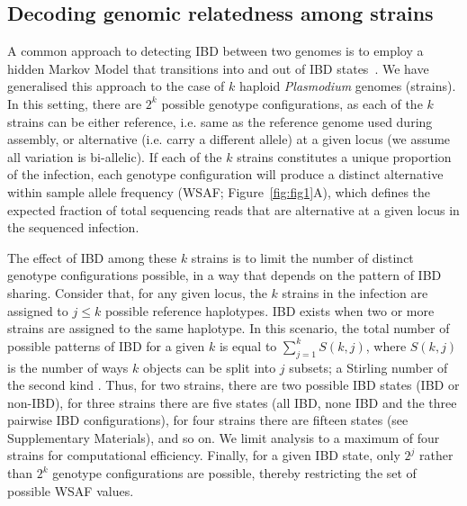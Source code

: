 \documentclass[9pt,lineno]{elife}
\begin{document}
\subsection{Decoding genomic relatedness among strains}

A common approach to detecting IBD between two genomes is to employ a hidden Markov Model that transitions into and out of IBD states~\citep{Chang2015, Gusev2009, Gusev2011}.  We have generalised this approach to the case of $k$ haploid {\it Plasmodium} genomes (strains). In this setting, there are $2^k$ possible genotype configurations, as each of the $k$ strains can be either reference, i.e. same as the reference genome used during assembly, or alternative (i.e. carry a different allele) at a given locus (we assume all variation is bi-allelic). If each of the $k$ strains constitutes a unique proportion of the infection, each genotype configuration will produce a distinct alternative within sample allele frequency (WSAF; Figure~\ref{fig:fig1}A), which defines the expected fraction of total sequencing reads that are alternative at a given locus in the sequenced infection.

The effect of IBD among these $k$ strains is to limit the number of distinct genotype configurations possible, in a way that depends on the pattern of IBD sharing. Consider that, for any given locus, the $k$ strains in the infection are assigned to $j \leq k$ possible reference haplotypes. IBD exists when two or more strains are assigned to the same haplotype. In this scenario, the total number of possible patterns of IBD for a given $k$ is equal to $\sum_{j=1}^{k} S(k,j)$, where $S(k,j)$ is the number of ways $k$ objects can be split into $j$ subsets; a Stirling number of the second kind \citep{Ronald1988}. Thus, for two strains, there are two possible IBD states (IBD or non-IBD), for three strains there are five states (all IBD, none IBD and the three pairwise IBD configurations), for four strains there are fifteen states (see Supplementary Materials), and so on. We limit analysis to a maximum of four strains for computational efficiency. Finally, for a given IBD state, only $2^j$ rather than $2^k$ genotype configurations are possible, thereby restricting the set of possible WSAF values.
\end{document}
